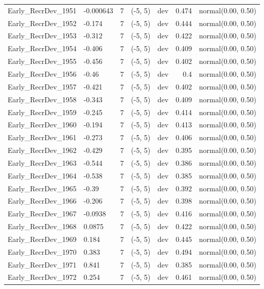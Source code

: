 \documentclass[
  english,
]{article}
\begin{document}
\begin{landscape}
\begin{longtable}{llrllrl}
Early\_RecrDev\_1951 & -0.000643 & 7 & (-5, 5) & dev & 0.474 & normal(0.00, 0.50) \\ 
Early\_RecrDev\_1952 & -0.174 & 7 & (-5, 5) & dev & 0.444 & normal(0.00, 0.50) \\ 
Early\_RecrDev\_1953 & -0.312 & 7 & (-5, 5) & dev & 0.422 & normal(0.00, 0.50) \\ 
Early\_RecrDev\_1954 & -0.406 & 7 & (-5, 5) & dev & 0.409 & normal(0.00, 0.50) \\ 
Early\_RecrDev\_1955 & -0.456 & 7 & (-5, 5) & dev & 0.402 & normal(0.00, 0.50) \\ 
Early\_RecrDev\_1956 & -0.46 & 7 & (-5, 5) & dev & 0.4 & normal(0.00, 0.50) \\ 
Early\_RecrDev\_1957 & -0.421 & 7 & (-5, 5) & dev & 0.402 & normal(0.00, 0.50) \\ 
Early\_RecrDev\_1958 & -0.343 & 7 & (-5, 5) & dev & 0.409 & normal(0.00, 0.50) \\ 
Early\_RecrDev\_1959 & -0.245 & 7 & (-5, 5) & dev & 0.414 & normal(0.00, 0.50) \\ 
Early\_RecrDev\_1960 & -0.194 & 7 & (-5, 5) & dev & 0.413 & normal(0.00, 0.50) \\ 
Early\_RecrDev\_1961 & -0.273 & 7 & (-5, 5) & dev & 0.406 & normal(0.00, 0.50) \\ 
Early\_RecrDev\_1962 & -0.429 & 7 & (-5, 5) & dev & 0.395 & normal(0.00, 0.50) \\ 
Early\_RecrDev\_1963 & -0.544 & 7 & (-5, 5) & dev & 0.386 & normal(0.00, 0.50) \\ 
Early\_RecrDev\_1964 & -0.538 & 7 & (-5, 5) & dev & 0.385 & normal(0.00, 0.50) \\ 
Early\_RecrDev\_1965 & -0.39 & 7 & (-5, 5) & dev & 0.392 & normal(0.00, 0.50) \\ 
Early\_RecrDev\_1966 & -0.206 & 7 & (-5, 5) & dev & 0.398 & normal(0.00, 0.50) \\ 
Early\_RecrDev\_1967 & -0.0938 & 7 & (-5, 5) & dev & 0.416 & normal(0.00, 0.50) \\ 
Early\_RecrDev\_1968 & 0.0875 & 7 & (-5, 5) & dev & 0.422 & normal(0.00, 0.50) \\ 
Early\_RecrDev\_1969 & 0.184 & 7 & (-5, 5) & dev & 0.445 & normal(0.00, 0.50) \\ 
Early\_RecrDev\_1970 & 0.383 & 7 & (-5, 5) & dev & 0.494 & normal(0.00, 0.50) \\ 
Early\_RecrDev\_1971 & 0.841 & 7 & (-5, 5) & dev & 0.385 & normal(0.00, 0.50) \\ 
Early\_RecrDev\_1972 & 0.254 & 7 & (-5, 5) & dev & 0.461 & normal(0.00, 0.50) \\ 

\end{longtable}
\end{landscape}
\end{document}
